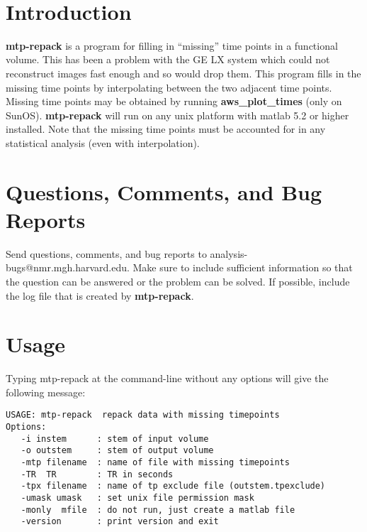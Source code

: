 \documentclass[10pt]{article}
\begin{document}
\begin{Large}
 \\
\end{Large}

\section{Introduction}
{\bf mtp-repack} is a program for filling in ``missing'' time points
in a functional volume.  This has been a problem with the GE LX system
which could not reconstruct images fast enough and so would drop them.
This program fills in the missing time points by interpolating between
the two adjacent time points. Missing time points may be obtained by
running {\bf aws\_plot\_times} (only on SunOS). {\bf mtp-repack} will
run on any unix platform with matlab 5.2 or higher installed. Note
that the missing time points must be accounted for in any statistical
analysis (even with interpolation).\\

\section{Questions, Comments, and Bug Reports}
Send questions, comments, and bug reports to
analysis-bugs@nmr.mgh.harvard.edu.  Make sure to include sufficient
information so that the question can be answered or the problem can be
solved. If possible, include the log file that is created by {\bf
mtp-repack}.\\

\section{Usage}
Typing mtp-repack at the command-line without any options will give the
following message:\\ 

\begin{small}
\begin{verbatim}
USAGE: mtp-repack  repack data with missing timepoints
Options:
   -i instem      : stem of input volume
   -o outstem     : stem of output volume
   -mtp filename  : name of file with missing timepoints
   -TR  TR        : TR in seconds
   -tpx filename  : name of tp exclude file (outstem.tpexclude)
   -umask umask   : set unix file permission mask
   -monly  mfile  : do not run, just create a matlab file
   -version       : print version and exit
\end{verbatim}
\end{small}
\end{document}
